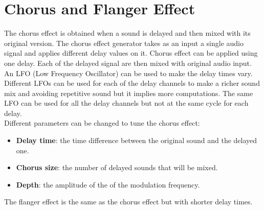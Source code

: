 \section{Chorus and Flanger Effect}

The chorus effect is obtained when a sound is delayed and then mixed with its original version. 
The chorus effect generator takes as an input a single audio signal and applies different delay values on it. Chorus effect can be applied using one delay. Each of the delayed signal are then mixed with original audio input. 
An LFO (Low Frequency Oscillator) can be used to make the delay times vary. Different LFOs can be used for each of the delay channels to make a richer sound mix and avoiding repetitive sound but it implies more computations. The same LFO can be used for all the delay channels but not at the same cycle for each delay. \\

Different parameters can be changed to tune the chorus effect:\\
\begin{itemize}
\item \textbf{Delay time}: the time difference between the original sound and the delayed one.
\item \textbf{Chorus size}: the number of delayed sounds that will be mixed.
\item \textbf{Depth}: the amplitude of the of the modulation frequency.
\end{itemize}

The flanger effect is the same as the chorus effect but with shorter delay times. 

